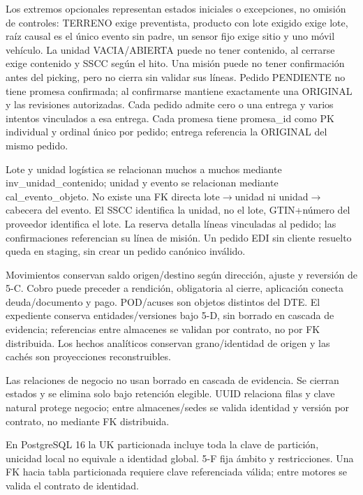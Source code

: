 Los extremos opcionales representan estados iniciales o excepciones, no omisión de controles: TERRENO exige preventista, producto con lote exigido exige lote, raíz causal es el único evento sin padre, un sensor fijo exige sitio y uno móvil vehículo. La unidad VACIA/ABIERTA puede no tener contenido, al cerrarse exige contenido y SSCC según el hito. Una misión puede no tener confirmación antes del picking, pero no cierra sin validar sus líneas. Pedido PENDIENTE no tiene promesa confirmada; al confirmarse mantiene exactamente una ORIGINAL y las revisiones autorizadas. Cada pedido admite cero o una entrega y varios intentos vinculados a esa entrega. Cada promesa tiene promesa\_id como PK individual y ordinal único por pedido; entrega referencia la ORIGINAL del mismo pedido.

Lote y unidad logística se relacionan muchos a muchos mediante inv\_unidad\_contenido; unidad y evento se relacionan mediante cal\_evento\_objeto. No existe una FK directa lote\ensuremath{\rightarrow}unidad ni unidad\ensuremath{\rightarrow}cabecera del evento. El SSCC identifica la unidad, no el lote, GTIN+número del proveedor identifica el lote. La reserva detalla líneas vinculadas al pedido; las confirmaciones referencian su línea de misión. Un pedido EDI sin cliente resuelto queda en staging, sin crear un pedido canónico inválido.

Movimientos conservan saldo origen/destino según dirección, ajuste y reversión de 5-C. Cobro puede preceder a rendición, obligatoria al cierre, aplicación conecta deuda/documento y pago. POD/acuses son objetos distintos del DTE. El expediente conserva entidades/versiones bajo 5-D, sin borrado en cascada de evidencia; referencias entre almacenes se validan por contrato, no por FK distribuida. Los hechos analíticos conservan grano/identidad de origen y las cachés son proyecciones reconstruibles.


Las relaciones de negocio no usan borrado en cascada de evidencia. Se cierran estados y se elimina solo bajo retención elegible. UUID relaciona filas y clave natural protege negocio; entre almacenes/sedes se valida identidad y versión por contrato, no mediante FK distribuida.

En PostgreSQL 16 la UK particionada incluye toda la clave de partición, unicidad local no equivale a identidad global. 5-F fija ámbito y restricciones. Una FK hacia tabla particionada requiere clave referenciada válida; entre motores se valida el contrato de identidad.

